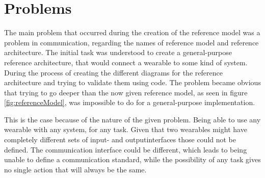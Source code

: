 \section{Problems}
The main problem that occurred during the creation of the \gls{reference model} was a problem in communication, regarding the names of \gls{reference model} and \gls{reference architecture}. The initial task was understood to create a general-purpose \gls{reference architecture}, that would connect a \gls{wearable} to some kind of system. During the process of creating the different diagrams for the reference architecture and trying to validate them using code. The problem became obvious that trying to go deeper than the now given \gls{reference model}, as seen in figure \ref{fig:referenceModel}, was impossible to do for a general-purpose implementation.

This is the case because of the nature of the given problem. Being able to use any wearable with any system, for any task. Given that two wearables might have completely different sets of input- and outputinterfaces those could not be defined. The communication interface could be different, which leads to being unable to define a communication standard, while the possibility of any task gives no single action that will always be the same.